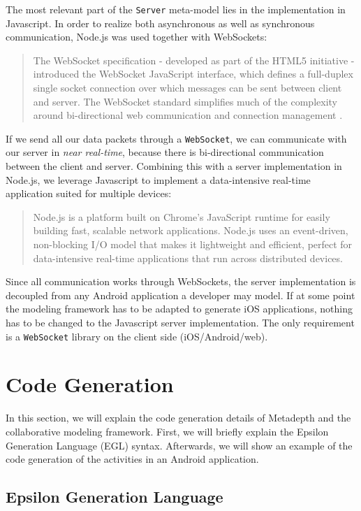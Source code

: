 The most relevant part of the \texttt{Server} meta-model lies in the implementation in Javascript. In order to realize both asynchronous as well as synchronous communication, Node.js \cite{NodeJS} was used together with WebSockets:
\begin{quotation}
The WebSocket specification - developed as part of the HTML5 initiative - introduced the WebSocket JavaScript interface, which defines a full-duplex single socket connection over which messages can be sent between client and server. The WebSocket standard simplifies much of the complexity around bi-directional web communication and connection management \cite{WebSockets}. 
\end{quotation}
If we send all our data packets through a \texttt{WebSocket}, we can communicate with our server in \textit{near real-time}, because there is bi-directional communication between the client and server. Combining this with a server implementation in Node.js, we leverage Javascript to implement a data-intensive real-time application suited for multiple devices:
\begin{quotation}
Node.js is a platform built on Chrome's JavaScript runtime for easily building fast, scalable network applications. Node.js uses an event-driven, non-blocking I/O model that makes it lightweight and efficient, perfect for data-intensive real-time applications that run across distributed devices.
\end{quotation}
Since all communication works through WebSockets, the server implementation is decoupled from any Android application a developer may model. If at some point the modeling framework has to be adapted to generate iOS applications, nothing has to be changed to the Javascript server implementation. The only requirement is a \texttt{WebSocket} library on the client side (iOS/Android/web).

\section{Code Generation}

In this section, we will explain the code generation details of Metadepth and the collaborative modeling framework. First, we will briefly explain the Epsilon Generation Language (EGL) syntax. Afterwards, we will show an example of the code generation of the activities in an Android application.

\subsection{Epsilon Generation Language}

